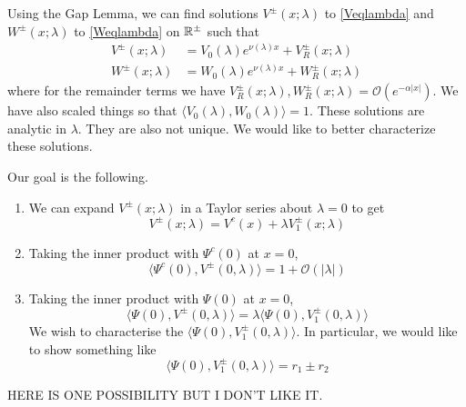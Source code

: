 \documentclass[thesis.tex]{subfiles}
\begin{document}
Using the Gap Lemma, we can find solutions $V^\pm(x; \lambda)$ to \eqref{Veqlambda} and $W^\pm(x; \lambda)$ to \eqref{Weqlambda} on $\mathbb{R}^\pm$ such that
\begin{align}
V^\pm(x; \lambda) &= V_0(\lambda)e^{\nu(\lambda)x} + V_R^\pm(x; \lambda) \label{Vpm} \\
W^\pm(x; \lambda) &= W_0(\lambda)e^{\nu(\lambda)x} + W_R^\pm(x; \lambda) \label{Vpm}
\end{align}
where for the remainder terms we have $V_R^\pm(x; \lambda), W_R^\pm(x; \lambda) = \mathcal{O}(e^{-\alpha |x|})$. We have also scaled things so that $\langle V_0(\lambda), W_0(\lambda) \rangle = 1$. These solutions are analytic in $\lambda$. They are also not unique. We would like to better characterize these solutions. 

Our goal is the following.
\begin{enumerate}
	\item We can expand $V^\pm(x; \lambda)$ in a Taylor series about $\lambda = 0$ to get
	\[
	V^\pm(x; \lambda) = V^c(x) + \lambda V_1^\pm(x; \lambda)
	\]
	\item Taking the inner product with $\Psi^c(0)$ at $x = 0$,
	\[
	\langle \Psi^c(0), V^\pm(0, \lambda) \rangle = 1 + \mathcal{O}(|\lambda|) 
	\]
	\item Taking the inner product with $\Psi(0)$ at $x = 0$,
	\[
	\langle \Psi(0), V^\pm(0, \lambda) \rangle = \lambda \langle \Psi(0), V_1^\pm(0, \lambda) \rangle
	\]
	We wish to characterise the $\langle \Psi(0), V_1^\pm(0, \lambda) \rangle$. In particular, we would like to show something like
	\[
	\langle \Psi(0), V_1^\pm(0, \lambda) \rangle = 
	r_1 \pm r_2
	\]
\end{enumerate}

HERE IS ONE POSSIBILITY BUT I DON'T LIKE IT.
\end{document}
